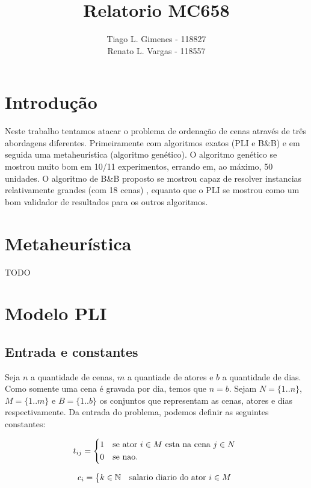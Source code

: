 \documentclass[a4paper,11pt]{article}
\title{Relatorio MC658}
\author{Tiago L. Gimenes - 118827\\
        Renato L. Vargas - 118557}
\begin{document}
\maketitle

\section*{Introdução}
Neste trabalho tentamos atacar o problema de ordenação de cenas através de três
abordagens diferentes. Primeiramente com algoritmos exatos (PLI e B\&B) e em seguida
uma metaheurística (algoritmo genético). O algoritmo genético se mostrou muito bom
em 10/11 experimentos, errando em, ao máximo, 50 unidades. O algoritmo de B\&B
proposto se mostrou capaz de resolver instancias relativamente grandes (com 18 cenas)
, equanto que o PLI se mostrou como um bom validador de resultados para os outros
algoritmos.

\section{Metaheurística}
TODO

\section{Modelo PLI}
\subsection{Entrada e constantes}
Seja $n$ a quantidade de cenas, $m$ a quantiade de atores e $b$ a quantidade de
dias. Como somente uma cena é gravada por dia, temos que $n = b$. Sejam $N=\{1..n\}$,
$M = \{1..m\}$ e $B=\{1..b\}$ os conjuntos que representam as cenas, atores e dias
respectivamente. Da entrada do problema, podemos definir as seguintes constantes:

\begin{equation}
  t_{ij} = \begin{dcases*}
              1 & se ator $i \in M$ esta na cena $j \in N$ \\
              0 & se nao.
           \end{dcases*}
  \label{tij}
\end{equation}

\begin{equation}
  c_{i} = \begin{dcases*} k \in \mathbb{N} & salario diario do ator $i \in M$ \end{dcases*}
\end{equation}
\end{document}
